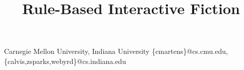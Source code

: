 \documentclass[computermodern]{sigplanconf}
\begin{document}


\title{Rule-Based Interactive Fiction}


           {Carnegie Mellon University, Indiana University}
           {\{cmartens\}@cs.cmu.edu,\{calvis,zsparks,webyrd\}@cs.indiana.edu}

\maketitle

\nocite{Covington:1996:PPD:230996}
\nocite{apt03principles}
\nocite{Marriottp98Pwc}

%


\end{document}
